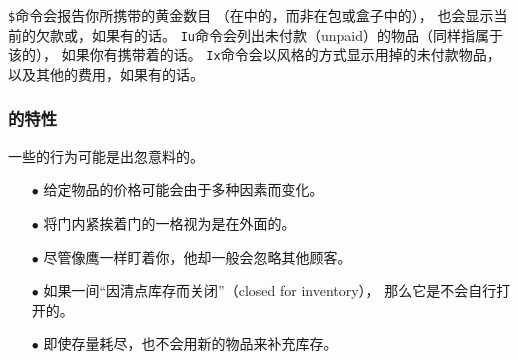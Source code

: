 \documentclass[a4paper, 10pt]{article}
\begin{document}
{\tt \$}命令会报告你所携带的黄金数目
（在\zhTransInventory{}中的，而非在包或盒子中的），
也会显示当前\zhTransShop{}的欠款或\zhTransCredit，如果有的话。
{\tt Iu}命令会列出未付款（unpaid）的物品（同样指属于该\zhTransShop{}的），
如果你有携带着的话。
{\tt Ix}命令会以\zhTransInventory{}风格的方式显示用掉的未付款物品，
以及其他的\zhTransShop{}费用，如果有的话。

\subsubsection*{\zhTransShop{}的特性}

一些\zhTransShop{}的行为可能是出忽意料的。

\begin{itemize}
\item[$\bullet$]
给定物品的价格可能会由于多种因素而变化。
\item[$\bullet$]
\zhTransShopkeeper{}将门内紧挨着门的一格视为是在\zhTransShop{}外面的。
\item[$\bullet$]
尽管\zhTransShopkeeper{}像鹰一样盯着你，他却一般会忽略其他顾客。
\item[$\bullet$]
如果一间\zhTransShop{}“因清点库存而关闭”（closed for inventory），
那么它是不会自行打开的。
\item[$\bullet$]
即使存量耗尽，\zhTransShop{}也不会用新的物品来补充库存。
\end{itemize}
\end{document}
